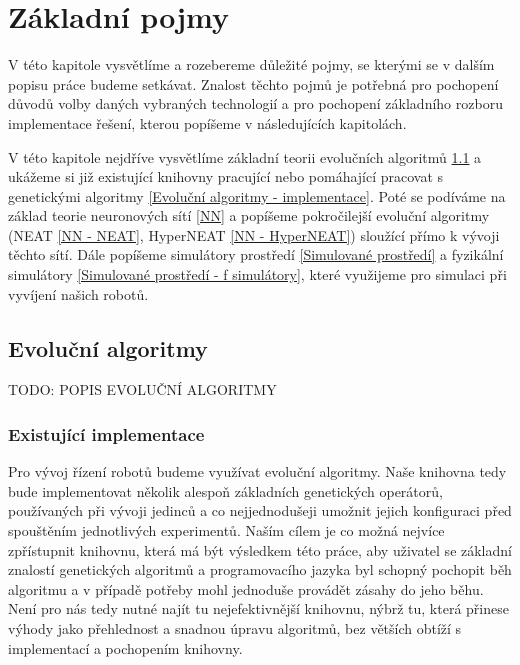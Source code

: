 
\chapter{Základní pojmy}

V této kapitole vysvětlíme a rozebereme důležité pojmy, se kterými se v dalším
popisu práce budeme setkávat. Znalost těchto pojmů je potřebná pro pochopení
důvodů volby daných vybraných technologií a pro pochopení základního rozboru
implementace řešení, kterou popíšeme v následujících kapitolách.

V této kapitole nejdříve vysvětlíme základní teorii evolučních algoritmů
\ref{Evoluční algoritmy} a ukážeme si již existující knihovny pracující nebo
pomáhající pracovat s genetickými algoritmy \ref{Evoluční algoritmy -
implementace}. Poté se podíváme na základ teorie neuronových sítí \ref{NN} a
popíšeme pokročilejší evoluční algoritmy (NEAT \ref{NN - NEAT}, HyperNEAT
\ref{NN - HyperNEAT}) sloužící přímo k vývoji těchto sítí. Dále popíšeme
simulátory prostředí \ref{Simulované prostředí} a fyzikální simulátory
\ref{Simulované prostředí - f simulátory}, které využijeme pro simulaci při
vyvíjení našich robotů.

\section{Evoluční algoritmy} \label{Evoluční algoritmy}

TODO: POPIS EVOLUČNÍ ALGORITMY

\subsection{Existující implementace} \label{Evoluční algoritmy - implementace}

Pro vývoj řízení robotů budeme využívat evoluční algoritmy. Naše knihovna tedy
bude implementovat několik alespoň základních genetických operátorů,
používaných při vývoji jedinců a co nejjednodušeji umožnit jejich konfiguraci před
spouštěním jednotlivých experimentů. Naším cílem je co možná nejvíce
zpřístupnit knihovnu, která má být výsledkem této práce, aby uživatel se základní
znalostí genetických algoritmů a programovacího jazyka byl schopný pochopit běh
algoritmu a v případě potřeby mohl jednoduše provádět zásahy do jeho běhu. Není
pro nás tedy nutné najít tu nejefektivnější knihovnu, nýbrž tu, která přinese
výhody jako přehlednost a snadnou úpravu algoritmů, bez větších obtíží s
implementací a pochopením knihovny.

